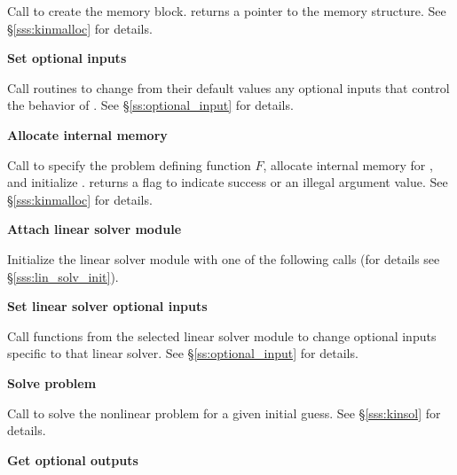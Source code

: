 \begin{Steps}
  Call  to create the {\kinsol} memory block.
   returns a pointer to the {\kinsol} memory structure.
  See \S\ref{sss:kinmalloc} for details.

\item
  {\bf Set optional inputs}

  Call  routines to change from their default values any
  optional inputs that control the behavior of {\kinsol}.
  See \S\ref{ss:optional_input} for details.

\item\label{i:kinsol_malloc} 
  {\bf Allocate internal memory}

  Call  
  to specify the problem defining function $F$,
  allocate internal memory for {\kinsol}, 
  and initialize {\kinsol}.
   returns a flag to indicate success or an illegal argument value.
  See \S\ref{sss:kinmalloc} for details.

\item\label{i:lin_solver} 
  {\bf Attach linear solver module}

  Initialize the linear solver module with one of the following calls
  (for details see \S\ref{sss:lin_solv_init}).

  {\s} 

  {\s} 

  {\s} 

  {\s} 

  
  
  
\item
  {\bf Set linear solver optional inputs}

  Call  functions from the selected linear solver module to
  change optional inputs specific to that linear solver.
  See \S\ref{ss:optional_input} for details.

\item
  {\bf Solve problem}

  Call  to solve the nonlinear problem for a given
  initial guess. See \S\ref{sss:kinsol} for details.

\item
  {\bf Get optional outputs}


\end{Steps}
